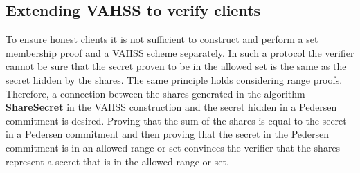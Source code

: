\subsection*{Extending VAHSS to verify clients}
To ensure honest clients it is not sufficient to construct and perform a set membership proof and a VAHSS scheme separately. In such a protocol the verifier cannot be sure that the secret proven to be in the allowed set is the same as the secret hidden by the shares. The same principle holds considering range proofs. Therefore, a connection between the shares generated in the algorithm \textbf{ShareSecret} in the VAHSS construction and the secret hidden in a Pedersen commitment is desired. Proving that the sum of the shares is equal to the secret in a Pedersen commitment and then proving that the secret in the Pedersen commitment is in an allowed range or set convinces the verifier that the shares represent a secret that is in the allowed range or set. %



